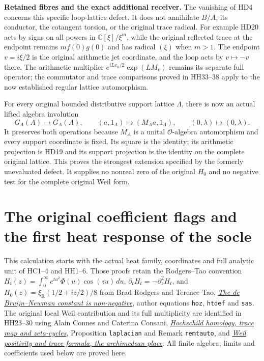 \documentclass[11pt,a4paper]{article}
\theoremstyle{definition}\newtheorem{definition}[theorem]{Definition}
\begin{document}
\HD\textbf{Retained fibres and the exact additional receiver.}
The vanishing of HD4 concerns this specific loop-lattice defect.
It does not annihilate $B/A$, its conductor, the cotangent torsion,
or the original trace radical. For example HD20 acts by signs
on all powers in $\mathbb C[\xi]/\xi^m$, while the original
reflected trace at the endpoint remains
$m\overline{f(0)}g(0)$ and has radical $(\xi)$ when $m>1$.
The endpoint $v=i\xi/2$ is the original arithmetic jet coordinate,
and the loop acts by $v\mapsto-v$ there. The arithmetic multiplier
$e^{iLx_0/2}\exp(LM_v)$ remains its separate full operator;
the commutator and trace comparisons proved in HH33--38 apply
to the now established regular lattice automorphism.

For every original bounded distributive support lattice $\Lambda$,
there is now an actual lifted algebra involution
\[
 G_\Lambda(A)\longrightarrow G_\Lambda(A),\qquad
 (a,1_\Lambda)\longmapsto(M_Aa,1_\Lambda),\qquad
 (0,\lambda)\longmapsto(0,\lambda).
 \tag{HD44}
\]
It preserves both operations because $M_A$ is a unital
$\mathcal O$-algebra automorphism and every support coordinate
is fixed. Its square is the identity; its arithmetic projection
is HD19 and its support projection is the identity on the
complete original lattice. This proves the strongest extension
specified by the formerly unevaluated defect.
It supplies no nonreal zero of the original $H_0$ and no negative
test for the complete original Weil form.


\section{The original coefficient flags and the first heat response of the socle}
\label{sec:heat-flag-response}

This calculation starts with the actual heat family, coordinates and
full analytic unit of HC1--4 and HH1--6. Those proofs retain the
Rodgers--Tao convention $H_t(z)=\int_0^\infty e^{tu^2}\Phi(u)\cos(zu)\,du$,
$\partial_tH_t=-\partial_z^2H_t$, and
$H_0(z)=\xi_{\mathrm R}(1/2+iz/2)/8$ from
Brad Rodgers and Terence Tao,
\href{https://arxiv.org/abs/1801.05914v5}{\emph{The de Bruijn--Newman constant is non-negative}},
author equations \texttt{hoz}, \texttt{htdef} and \texttt{sas}.
The original local Weil contribution and its full multiplicity are
identified in HH23--30 using Alain Connes and Caterina Consani,
\href{https://arxiv.org/abs/2207.10419}{\emph{Hochschild homology, trace map and zeta-cycles}},
Proposition \texttt{laplacian} and Remark \texttt{remtauto}, and
\href{https://arxiv.org/abs/2006.13771v1}{\emph{Weil positivity and trace formula, the archimedean place}}.
All finite algebra, limits and coefficients used below are proved here.
\end{document}
